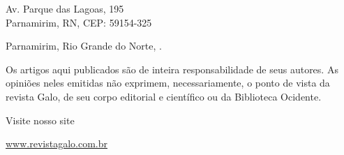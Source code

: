{\vfill

Av. Parque das Lagoas, 195\\
Parnamirim, RN, CEP: 59154-325

\vspace{5mm}

Parnamirim, Rio Grande do Norte, \journalPubFullDate{}.

\clearpage

\thispagestyle{empty}

\begin{vplace}
    \centering Os artigos aqui publicados são de inteira responsabilidade de seus autores. As opiniões neles emitidas não exprimem, necessariamente, o ponto de vista da revista Galo, de seu corpo editorial e científico ou da Biblioteca Ocidente.

    \vspace{5mm}

    Visite nosso site

    \url{www.revistagalo.com.br}
\end{vplace}

}
